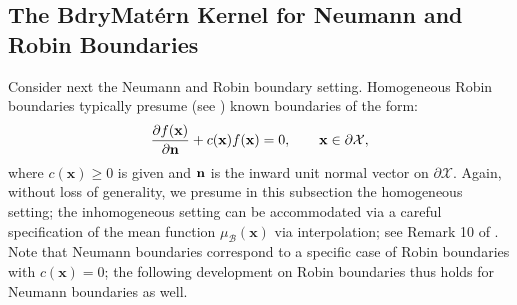 \documentclass[aos,preprint]{imsart}
\theoremstyle{plain}
\newcommand{\CalX}{\mathcal X}
\newcommand{\Bx}{\bold x}
\newcommand{\cmtS}[1]{{\color{red}{(Simon: #1)}}}
\theoremstyle{remark}
\begin{document}
\subsection{The BdryMat\'ern Kernel for Neumann and Robin Boundaries}
Consider next the Neumann and Robin boundary setting. Homogeneous Robin boundaries typically presume (see \cite{zwillinger2021handbook}) known boundaries of the form:
\begin{equation}
\frac{\partial f(\Bx)}{\partial \bold{n}} + c(\Bx)f(\Bx) = 0, \quad \quad \Bx \in \partial \mathcal{X},
\label{eq:robinbdry}
\end{equation}
where $c(\mathbf{x}) \geq 0$ is given and $\bold{n}$ is the inward unit
normal vector on $\partial\CalX$. Again, without loss of generality, we presume in this subsection the homogeneous setting; the inhomogeneous setting can be accommodated via a careful specification of the mean function $\mu_{\mathcal{B}}(\mathbf{x})$ via interpolation; see Remark 10 of \cite{dalton2024boundary}. Note that Neumann boundaries correspond to a specific case of Robin boundaries with $c(\mathbf{x})=0$; the following development on Robin boundaries thus holds for Neumann boundaries as well. 

\end{document}
